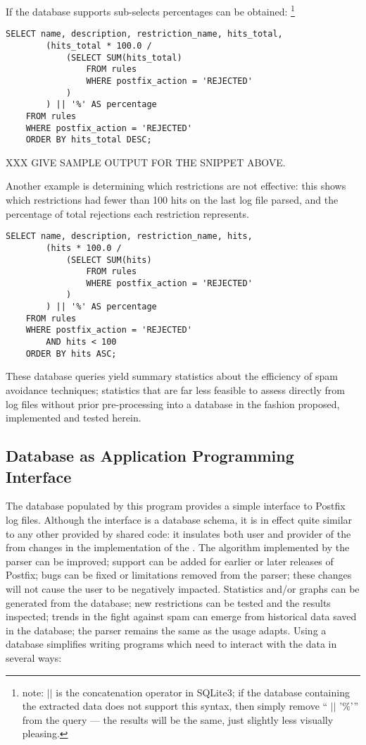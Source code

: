 If the database supports sub-selects percentages can be obtained:
\footnote{\SQL{} note: $||$ is the concatenation operator in SQLite3; if
the database containing the extracted data does not support this syntax,
then simply remove `` $||$ '$\%$'\hspace{1ex}'' from the query --- the
results will be the same, just slightly less visually pleasing.}

\begin{verbatim}
SELECT name, description, restriction_name, hits_total,
        (hits_total * 100.0 /
            (SELECT SUM(hits_total)
                FROM rules
                WHERE postfix_action = 'REJECTED'
            )
        ) || '%' AS percentage
    FROM rules
    WHERE postfix_action = 'REJECTED'
    ORDER BY hits_total DESC;
\end{verbatim}

XXX GIVE SAMPLE OUTPUT FOR THE SNIPPET ABOVE\@.

Another example is determining which restrictions are not effective: this
shows which restrictions had fewer than 100 hits on the last log file
parsed, and the percentage of total rejections each restriction represents.

\begin{verbatim}
SELECT name, description, restriction_name, hits,
        (hits * 100.0 /
            (SELECT SUM(hits)
                FROM rules
                WHERE postfix_action = 'REJECTED'
            )
        ) || '%' AS percentage
    FROM rules
    WHERE postfix_action = 'REJECTED'
        AND hits < 100
    ORDER BY hits ASC;
\end{verbatim}

These database queries yield summary statistics about the efficiency of
spam avoidance techniques; statistics that are far less feasible to assess
directly from log files without prior pre-processing into a database in the
fashion proposed, implemented and tested herein.

\subsection{Database as Application Programming Interface}

\label{database as API}

The database populated by this program provides a simple interface to
Postfix log files.  Although the interface is a database schema, it is in
effect quite similar to any other \API{} provided by shared code: it
insulates both user and provider of the \API{} from changes in the
implementation of the \API{}\@.  The algorithm implemented by the parser
can be improved; support can be added for earlier or later releases of
Postfix; bugs can be fixed or limitations removed from the parser; these
changes will not cause the user to be negatively impacted.  Statistics
and/or graphs can be generated from the database; new restrictions can be
tested and the results inspected; trends in the fight against spam can
emerge from historical data saved in the database; the parser remains the
same as the usage adapts.  Using a database simplifies writing programs
which need to interact with the data in several ways:

